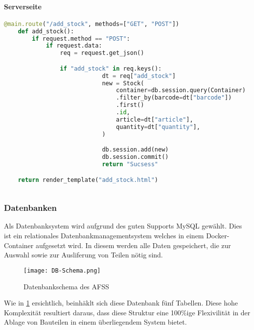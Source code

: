 \paragraph{Serverseite}

\begin{lstlisting}[language=Python]
    @main.route("/add_stock", methods=["GET", "POST"])
    def add_stock():
        if request.method == "POST":
            if request.data:
                req = request.get_json()

                if "add_stock" in req.keys():
                            dt = req["add_stock"]
                            new = Stock(
                                container=db.session.query(Container)
                                .filter_by(barcode=dt["barcode"])
                                .first()
                                .id,
                                article=dt["article"],
                                quantity=dt["quantity"],
                            )

                            db.session.add(new)
                            db.session.commit()
                            return "Sucsess"

    return render_template("add_stock.html")
 
\end{lstlisting}    


\subsubsection{Datenbanken}

Als Datenbanksystem wird aufgrund des guten Supports MySQL gewählt. Dies ist ein relationales Datenbankmanagementsystem welches in einem Docker-Container aufgesetzt wird. In diesem werden alle Daten gespeichert, die zur Auswahl sowie zur Ausliferung von Teilen nötig sind.

\begin{figure}[h]
    \texttt{[image: DB-Schema.png]}
    \centering
    \caption{Datenbankschema des AFSS}
    \label{DB-Scema}

\end{figure}

Wie in \ref{DB-Scema} ersichtlich, beinhäklt sich diese Datenbank fünf Tabellen. Diese hohe Komplexität resultiert daraus, dass diese Struktur eine 100\%ige Flexivilität in der Ablage von Bauteilen in einem überliegendem System bietet.

